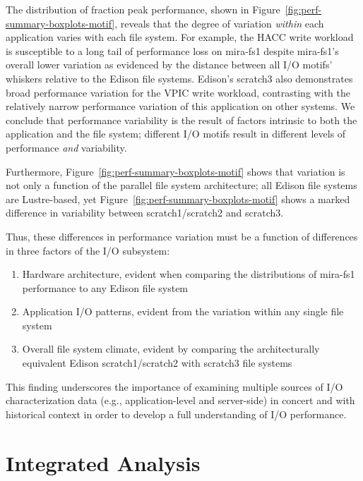 The distribution of fraction peak performance, shown in Figure~\ref{fig:perf-summary-boxplots-motif}, 
reveals that the degree of variation \emph{within} each application varies with each file system.
For example, the HACC write workload is susceptible to a long tail of performance loss on mira-fs1 despite mira-fs1's overall lower variation as evidenced by the distance between all I/O motifs' whiskers relative to the Edison file systems.
Edison's scratch3 also demonstrates broad performance variation for the VPIC write workload, contrasting with the relatively narrow performance variation of this application on other systems.  We conclude that performance variability is the result of factors intrinsic to both the application and the file system;
different I/O motifs result in different levels of performance \emph{and} variability.

Furthermore, Figure~\ref{fig:perf-summary-boxplots-motif} shows that variation is not only a function of the parallel file system architecture; all Edison file systems are Lustre-based, yet Figure~\ref{fig:perf-summary-boxplots-motif} shows a marked difference in variability between scratch1/scratch2 and scratch3.

Thus, these differences in performance variation must be a function of differences in three factors of the I/O subsystem:

\begin{enumerate}[leftmargin=*]
\item Hardware architecture, evident when comparing the distributions of mira-fs1 performance to any Edison file system
\item Application I/O patterns, evident from the variation within any single file system
\item Overall file system climate, evident by comparing the architecturally equivalent Edison scratch1/scratch2 with scratch3 file systems
\end{enumerate}

This finding underscores the importance of examining multiple sources of I/O characterization data (e.g., application-level and server-side) in concert and with historical context in order to develop a full understanding of I/O performance.

\section{Integrated Analysis} \label{sec:results/umami}

